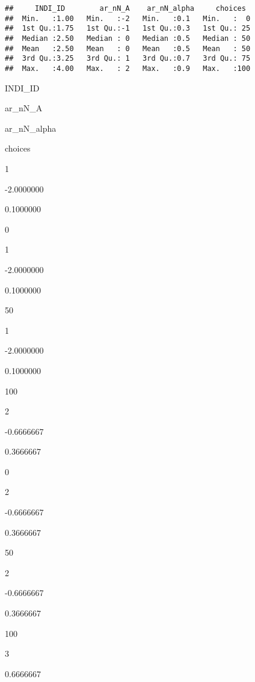 \documentclass[]{article}
\newenvironment{Shaded}{\begin{snugshade}}{\end{snugshade}}
\newcommand{\DataTypeTok}[1]{\textcolor[rgb]{0.13,0.29,0.53}{#1}}
\newcommand{\KeywordTok}[1]{\textcolor[rgb]{0.13,0.29,0.53}{\textbf{#1}}}
\newcommand{\NormalTok}[1]{#1}
\newcommand{\OperatorTok}[1]{\textcolor[rgb]{0.81,0.36,0.00}{\textbf{#1}}}
\newcommand{\StringTok}[1]{\textcolor[rgb]{0.31,0.60,0.02}{#1}}
\begin{document}
\begin{verbatim}
##     INDI_ID        ar_nN_A    ar_nN_alpha     choices   
##  Min.   :1.00   Min.   :-2   Min.   :0.1   Min.   :  0  
##  1st Qu.:1.75   1st Qu.:-1   1st Qu.:0.3   1st Qu.: 25  
##  Median :2.50   Median : 0   Median :0.5   Median : 50  
##  Mean   :2.50   Mean   : 0   Mean   :0.5   Mean   : 50  
##  3rd Qu.:3.25   3rd Qu.: 1   3rd Qu.:0.7   3rd Qu.: 75  
##  Max.   :4.00   Max.   : 2   Max.   :0.9   Max.   :100
\end{verbatim}

\begin{Shaded}
\end{Shaded}

INDI\_ID

ar\_nN\_A

ar\_nN\_alpha

choices

1

-2.0000000

0.1000000

0

1

-2.0000000

0.1000000

50

1

-2.0000000

0.1000000

100

2

-0.6666667

0.3666667

0

2

-0.6666667

0.3666667

50

2

-0.6666667

0.3666667

100

3

0.6666667
\end{document}
